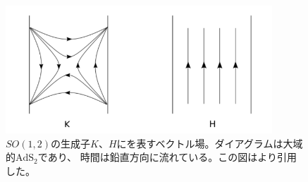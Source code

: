 \begin{figure}[ht]
	\centering
	\includegraphics[width=10cm]{figures/time_translation}
	\caption{$SO(1,2)$の生成子$K$、$H$にを表すベクトル場。ダイアグラムは大域的$\mathrm{AdS}_2$であり、
		時間は鉛直方向に流れている。この図は\cite{stanford_chaos}より引用した。
	}
	\label{fig:time_translation}
\end{figure}

